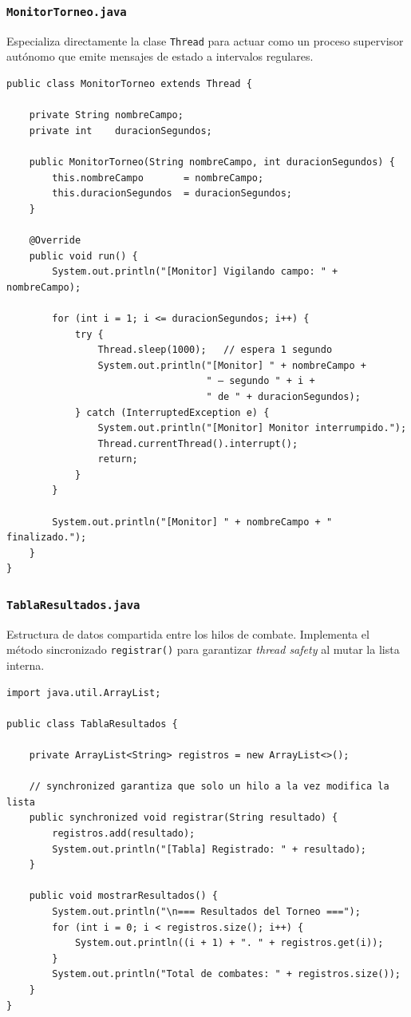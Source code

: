 \documentclass[11pt,letterpaper]{article}
\begin{document}
\subsubsection{\texttt{MonitorTorneo.java}}
Especializa directamente la clase \texttt{Thread} para actuar como un proceso supervisor autónomo que emite mensajes de estado a intervalos regulares.
\begin{lstlisting}[style=JavaStyle]
public class MonitorTorneo extends Thread {

    private String nombreCampo;
    private int    duracionSegundos;

    public MonitorTorneo(String nombreCampo, int duracionSegundos) {
        this.nombreCampo       = nombreCampo;
        this.duracionSegundos  = duracionSegundos;
    }

    @Override
    public void run() {
        System.out.println("[Monitor] Vigilando campo: " + nombreCampo);

        for (int i = 1; i <= duracionSegundos; i++) {
            try {
                Thread.sleep(1000);   // espera 1 segundo
                System.out.println("[Monitor] " + nombreCampo +
                                   " — segundo " + i +
                                   " de " + duracionSegundos);
            } catch (InterruptedException e) {
                System.out.println("[Monitor] Monitor interrumpido.");
                Thread.currentThread().interrupt();
                return;
            }
        }

        System.out.println("[Monitor] " + nombreCampo + " finalizado.");
    }
}
\end{lstlisting}

\subsubsection{\texttt{TablaResultados.java}}
Estructura de datos compartida entre los hilos de combate. Implementa el método sincronizado \texttt{registrar()} para garantizar \textit{thread safety} al mutar la lista interna.
\begin{lstlisting}[style=JavaStyle]
import java.util.ArrayList;

public class TablaResultados {

    private ArrayList<String> registros = new ArrayList<>();

    // synchronized garantiza que solo un hilo a la vez modifica la lista
    public synchronized void registrar(String resultado) {
        registros.add(resultado);
        System.out.println("[Tabla] Registrado: " + resultado);
    }

    public void mostrarResultados() {
        System.out.println("\n=== Resultados del Torneo ===");
        for (int i = 0; i < registros.size(); i++) {
            System.out.println((i + 1) + ". " + registros.get(i));
        }
        System.out.println("Total de combates: " + registros.size());
    }
}
\end{lstlisting}
\end{document}
